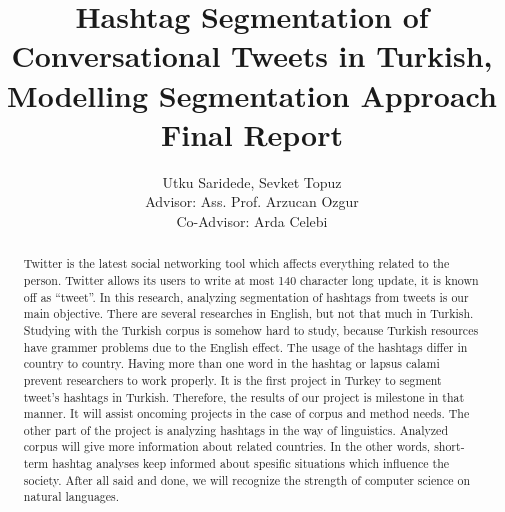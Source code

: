 \documentclass[12pt]{comjnl}
\begin{document}
\title[Hashtag Segmentation of Conversational Tweets in Turkish]{Hashtag Segmentation of Conversational Tweets in Turkish, Modelling Segmentation Approach Final Report}
\author{Utku Saridede, Sevket Topuz\\
Advisor: Ass. Prof. Arzucan Ozgur\\
Co-Advisor: Arda Celebi}
 




\begin{abstract}	
Twitter is the latest social networking tool which affects everything related to the person.
Twitter allows its users to write at most 140 character long update, it is known off as 
``tweet''. In this research, analyzing segmentation of hashtags from tweets is our main objective. There are
several researches in English, but not that much in Turkish. Studying with the Turkish corpus is
somehow hard to study, because Turkish resources have grammer problems due to the English effect.
The usage of the hashtags differ in country to country. Having more than one word in the hashtag or lapsus calami 
prevent researchers to work properly. It is the first project in Turkey to segment tweet's hashtags in Turkish. Therefore, the results of our project is milestone in that manner. It will assist oncoming projects in the case of corpus and method needs. The other part of the project is analyzing hashtags in the way of linguistics.
Analyzed corpus will give more information about related countries. In the other words, short-term
hashtag analyses keep informed about spesific situations which influence the society. After all said
and done, we will recognize the strength of computer science on natural languages.
\end{abstract}

\maketitle
\onecolumn
\tableofcontents
\newpage
\end{document}
